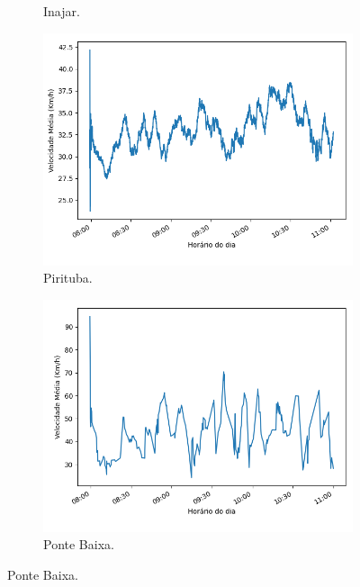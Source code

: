 \begin{figure}[ht]
\begin{subfigure}{.45\textwidth}
  \caption{Inajar.}
  \label{fig::avg_speed_Inajar}
\end{subfigure}
\centering
\begin{subfigure}{.45\textwidth}
  \centering
  \includegraphics[width=\textwidth]{figuras/detect_graphics/avg_speed_7-dez-su-corr_Pirituba.png}
  \caption{Pirituba.}
  \label{fig::avg_speed_Pirituba}
\end{subfigure}%
\begin{subfigure}{.45\textwidth}
  \centering
  \includegraphics[width=\textwidth]{figuras/detect_graphics/avg_speed_7-dez-su-corr_PonteBaixa.png}
  \caption{Ponte Baixa.}

\end{subfigure}
\end{figure}
